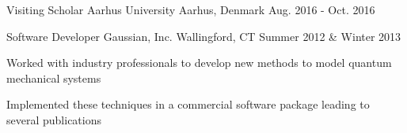 


\begin{cventries}


\cventry
{Visiting Scholar} %
{Aarhus University} %
{Aarhus, Denmark} %
{Aug. 2016 - Oct. 2016} %
{ %
}


\cventry
{Software Developer} %
{Gaussian, Inc.} %
{Wallingford, CT} %
{Summer 2012 \& Winter 2013} %
{ %
\begin{cvitems}
\item {Worked with industry professionals to develop new methods to model quantum mechanical systems}
\item{Implemented these techniques in a commercial software package leading to several publications}
\end{cvitems}
}



\end{cventries}